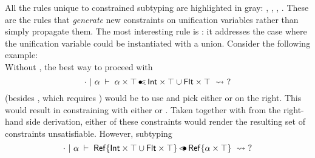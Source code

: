 All the rules unique to constrained subtyping are highlighted in gray:
, , , .
These are the rules that \emph{generate} new constraints on unification
variables rather than simply propagate them.
The most interesting rule is : it addresses the case
where the unification variable could be instantiated with a union.
Consider the following example:\\
Without , the best way to proceed with
\[
    \cdot~\vert~\alpha\;\vdash\;\alpha \times \top \operatorname{\bullet\!\!\lessdot} \mathsf{Int} \times \top \cup \mathsf{Flt} \times \top\ \rightsquigarrow\ ?
\]
(besides , which requires \ctrsngl{\va}{\tybot})
would be to use  and pick either \typair{\tyint}{\tyany}
or \typair{\tyflt}{\tyany} on the right. This would result in constraining \va 
with either \ctrsngl{\va}{\tyint} or \ctrsngl{\va}{\tyflt}.
Taken together with \ctrset{\ctrsub{\tyint}{\va}, \ctrsub{\tyflt}{\va}}
from the right-hand side derivation,
either of these constraints would render the resulting set of constraints
unsatisfiable.
However, subtyping
\[
    \cdot~\vert~\alpha\;\vdash\;\mathsf{Ref}\{\mathsf{Int} \times \top \cup \mathsf{Flt} \times \top\} \operatorname{\lessdot\!\!\bullet} \mathsf{Ref}\{\alpha \times \top\}\ \rightsquigarrow\ ?
\]
